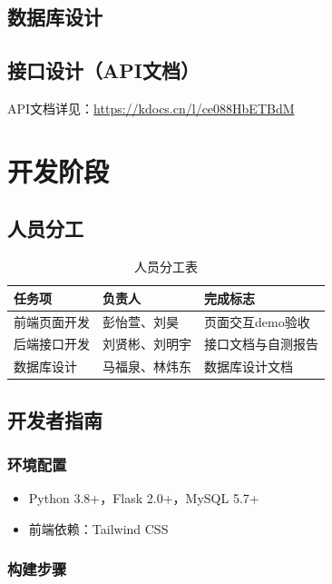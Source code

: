 \documentclass[a4paper]{article}
\begin{document}
\subsection{数据库设计}


\subsection{接口设计（API文档）}

API文档详见：\url{https://kdocs.cn/l/ce088HbETBdM}

\section{开发阶段}

\subsection{人员分工}

\begin{table}[H]
\centering
\begin{tabular}{|l|l|l|}
\hline
\textbf{任务项} & \textbf{负责人} & \textbf{完成标志} \\
\hline
前端页面开发 & 彭怡萱、刘昊 & 页面交互demo验收 \\
\hline
后端接口开发 & 刘贤彬、刘明宇 & 接口文档与自测报告 \\
\hline
数据库设计 & 马福泉、林炜东 & 数据库设计文档 \\
\hline
\end{tabular}
\caption{人员分工表}
\end{table}

\subsection{开发者指南}

\subsubsection{环境配置}

\begin{itemize}
    \item Python 3.8+，Flask 2.0+，MySQL 5.7+
    \item 前端依赖：Tailwind CSS
\end{itemize}

\subsubsection{构建步骤}
\end{document}
